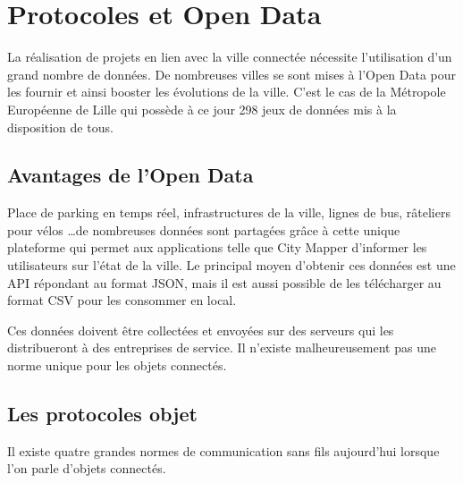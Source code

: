 




\section{Protocoles et Open Data}

La réalisation de projets en lien avec la ville connectée nécessite l'utilisation d'un grand nombre de données.
De nombreuses villes se sont mises à l'Open Data pour les fournir et ainsi booster les évolutions de la ville.
C'est le cas de la Métropole Européenne de Lille qui possède à ce jour 298 jeux de données mis à la disposition de tous.

\subsection{Avantages de l'Open Data}

Place de parking en temps réel, infrastructures de la ville, lignes de bus, râteliers pour vélos \dots de nombreuses
données sont partagées grâce à cette unique plateforme qui permet aux applications telle que City Mapper
d'informer les utilisateurs sur l'état de la ville.
Le principal moyen d'obtenir ces données est une API répondant au format JSON, mais il est aussi possible de les
télécharger au format CSV pour les consommer en local.

Ces données doivent être collectées et envoyées sur des serveurs qui les distribueront à des entreprises de service.
Il n'existe malheureusement pas une norme unique pour les objets connectés.

\subsection{Les protocoles objet}

Il existe quatre grandes normes de communication sans fils aujourd'hui lorsque l'on parle d'objets connectés.

